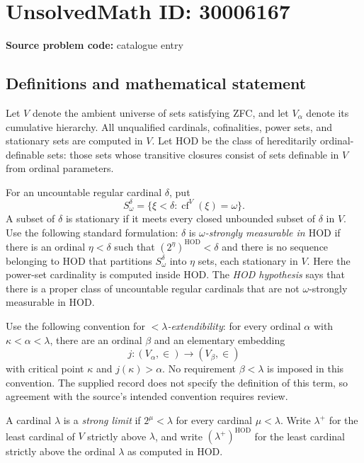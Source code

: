 \documentclass[11pt]{article}
\begin{document}
\section*{UnsolvedMath ID: 30006167}
\textbf{Source problem code:} catalogue entry
\subsection{Definitions and mathematical statement}
Let \(V\) denote the ambient universe of sets satisfying ZFC, and let \(V_\alpha\) denote its cumulative hierarchy. All unqualified cardinals, cofinalities, power sets, and stationary sets are computed in \(V\). Let \(\mathrm{HOD}\) be the class of hereditarily ordinal-definable sets: those sets whose transitive closures consist of sets definable in \(V\) from ordinal parameters.

For an uncountable regular cardinal \(\delta\), put
\[
S^\delta_\omega=\{\xi<\delta:\operatorname{cf}^{V}(\xi)=\omega\}.
\]
A subset of \(\delta\) is stationary if it meets every closed unbounded subset of \(\delta\) in \(V\). Use the following standard formulation: \(\delta\) is \emph{\(\omega\)-strongly measurable in \(\mathrm{HOD}\)} if there is an ordinal \(\eta<\delta\) such that \((2^\eta)^{\mathrm{HOD}}<\delta\) and there is no sequence belonging to \(\mathrm{HOD}\) that partitions \(S^\delta_\omega\) into \(\eta\) sets, each stationary in \(V\). Here the power-set cardinality is computed inside \(\mathrm{HOD}\). The \emph{HOD hypothesis} says that there is a proper class of uncountable regular cardinals that are not \(\omega\)-strongly measurable in \(\mathrm{HOD}\).

Use the following convention for \emph{\(<\lambda\)-extendibility}: for every ordinal \(\alpha\) with \(\kappa<\alpha<\lambda\), there are an ordinal \(\beta\) and an elementary embedding
\[
j:(V_\alpha,\in)\longrightarrow(V_\beta,\in)
\]
with critical point \(\kappa\) and \(j(\kappa)>\alpha\). No requirement \(\beta<\lambda\) is imposed in this convention. The supplied record does not specify the definition of this term, so agreement with the source's intended convention requires review.

A cardinal \(\lambda\) is a \emph{strong limit} if \(2^\mu<\lambda\) for every cardinal \(\mu<\lambda\). Write \(\lambda^+\) for the least cardinal of \(V\) strictly above \(\lambda\), and write \((\lambda^+)^{\mathrm{HOD}}\) for the least cardinal strictly above the ordinal \(\lambda\) as computed in \(\mathrm{HOD}\).
\end{document}
